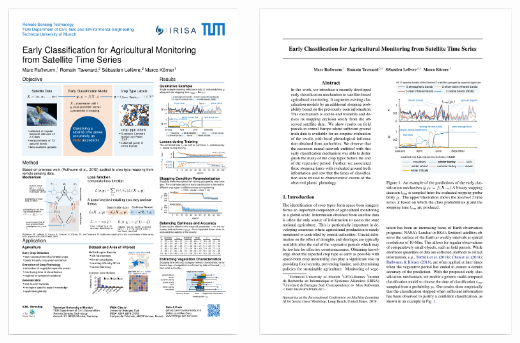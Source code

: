 \documentclass[%
  aspectratio=169,
  9pt,
  USenglish,
  titlegraphic, %
  progressbar,
]{beamer}
\begin{document}
\begin{frame}
	\begin{columns}
	\includegraphics[width=.6\textwidth]{images/AI4SG_Poster}
	
	\includegraphics[width=.6\textwidth]{images/AI4SG_Paper}
	
	\end{columns}
\end{frame}
\end{document}
